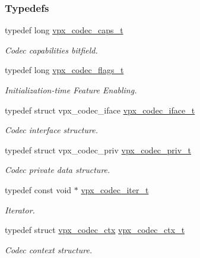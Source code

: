 \subsubsection*{\-Typedefs}
\begin{DoxyCompactItemize}
\item 
typedef long \hyperlink{group__codec_gad2b690c0ef83cbd83a7234078791913f}{vpx\-\_\-codec\-\_\-caps\-\_\-t}
\begin{DoxyCompactList}\small\item\em \-Codec capabilities bitfield. \end{DoxyCompactList}\item 
typedef long \hyperlink{group__codec_ga3b36d5af89ddc463489fe5bde0a57877}{vpx\-\_\-codec\-\_\-flags\-\_\-t}
\begin{DoxyCompactList}\small\item\em \-Initialization-\/time \-Feature \-Enabling. \end{DoxyCompactList}\item 
typedef struct vpx\-\_\-codec\-\_\-iface \hyperlink{group__codec_gad654f3da60151f5dfef70aca00ef1e9e}{vpx\-\_\-codec\-\_\-iface\-\_\-t}
\begin{DoxyCompactList}\small\item\em \-Codec interface structure. \end{DoxyCompactList}\item 
typedef struct vpx\-\_\-codec\-\_\-priv \hyperlink{group__codec_ga1e262f91be9141a7176335fd409397ab}{vpx\-\_\-codec\-\_\-priv\-\_\-t}
\begin{DoxyCompactList}\small\item\em \-Codec private data structure. \end{DoxyCompactList}\item 
typedef const void $\ast$ \hyperlink{group__codec_ga6ea348f76b1f8a1fe50e14db684146c6}{vpx\-\_\-codec\-\_\-iter\-\_\-t}
\begin{DoxyCompactList}\small\item\em \-Iterator. \end{DoxyCompactList}\item 
typedef struct \hyperlink{structvpx__codec__ctx}{vpx\-\_\-codec\-\_\-ctx} \hyperlink{group__codec_gad03e2dfa6ae511db7d25be6bbb336233}{vpx\-\_\-codec\-\_\-ctx\-\_\-t}
\begin{DoxyCompactList}\small\item\em \-Codec context structure. \end{DoxyCompactList}\end{DoxyCompactItemize}
